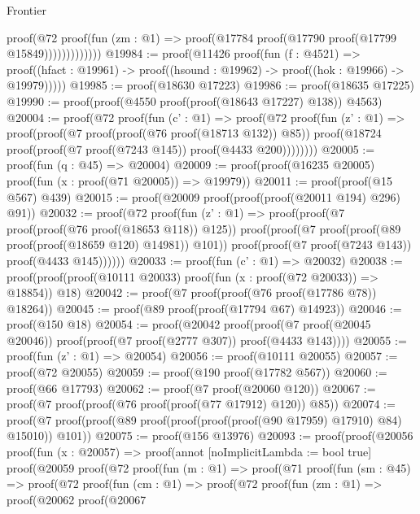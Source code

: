 \begin{lexlean}{Frontier}
\begin{coremodule}
                          proof(@72
                              proof(fun (zm : @1) =>
                                proof(@17784 proof(@17790 proof(@17799 @15849)))))))))))))
@19984 := proof(@11426
      proof(fun (f : @4521) =>
        proof((hfact : @19961) -> proof((hsound : @19962) -> proof((hok : @19966) -> @19979)))))
@19985 := proof(@18630 @17223)
@19986 := proof(@18635 @17225)
@19990 := proof(proof(@4550 proof(proof(@18643 @17227) @138)) @4563)
@20004 := proof(@72
      proof(fun (c' : @1) =>
        proof(@72
            proof(fun (z' : @1) =>
              proof(proof(@7 proof(proof(@76 proof(@18713 @132)) @85))
                  proof(@18724 proof(proof(@7 proof(@7243 @145)) proof(@4433 @200))))))))
@20005 := proof(fun (q : @45) => @20004)
@20009 := proof(proof(@16235 @20005) proof(fun (x : proof(@71 @20005)) => @19979))
@20011 := proof(proof(@15 @567) @439)
@20015 := proof(@20009 proof(proof(proof(@20011 @194) @296) @91))
@20032 := proof(@72
      proof(fun (z' : @1) =>
        proof(proof(@7 proof(proof(@76 proof(@18653 @118)) @125))
            proof(proof(@7 proof(proof(@89 proof(proof(@18659 @120) @14981)) @101))
                proof(proof(@7 proof(@7243 @143)) proof(@4433 @145))))))
@20033 := proof(fun (c' : @1) => @20032)
@20038 := proof(proof(proof(@10111 @20033) proof(fun (x : proof(@72 @20033)) => @18854)) @18)
@20042 := proof(@7 proof(proof(@76 proof(@17786 @78)) @18264))
@20045 := proof(@89 proof(proof(@17794 @67) @14923))
@20046 := proof(@150 @18)
@20054 := proof(@20042
      proof(proof(@7 proof(@20045 @20046)) proof(proof(@7 proof(@2777 @307)) proof(@4433 @143))))
@20055 := proof(fun (z' : @1) => @20054)
@20056 := proof(@10111 @20055)
@20057 := proof(@72 @20055)
@20059 := proof(@190 proof(@17782 @567))
@20060 := proof(@66 @17793)
@20062 := proof(@7 proof(@20060 @120))
@20067 := proof(@7 proof(proof(@76 proof(proof(@77 @17912) @120)) @85))
@20074 := proof(@7 proof(proof(@89 proof(proof(proof(proof(@90 @17959) @17910) @84) @15010)) @101))
@20075 := proof(@156 @13976)
@20093 := proof(proof(@20056
        proof(fun (x : @20057) =>
          proof(annot [noImplicitLambda := bool true]
            proof(@20059
                proof(@72
                    proof(fun (m : @1) =>
                      proof(@71
                          proof(fun (sm : @45) =>
                            proof(@72
                                proof(fun (cm : @1) =>
                                  proof(@72
                                      proof(fun (zm : @1) =>
                                        proof(@20062
                                            proof(@20067

\end{coremodule}
\end{lexlean}

